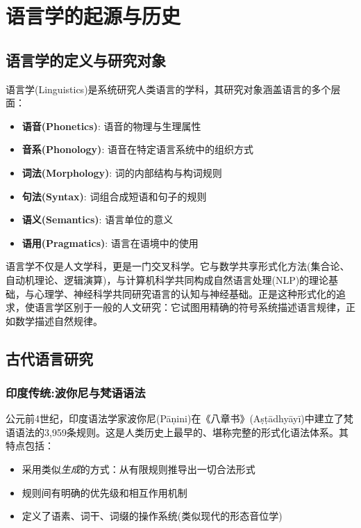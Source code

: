 \clearpage
\vspace*{\fill}
\section{语言学的起源与历史}
\vspace*{\fill}
\clearpage


\subsection{语言学的定义与研究对象}

语言学(Linguistics)是系统研究人类语言的学科，其研究对象涵盖语言的多个层面：
\begin{itemize}
    \item \textbf{语音(Phonetics)}: 语音的物理与生理属性
    \item \textbf{音系(Phonology)}: 语音在特定语言系统中的组织方式
    \item \textbf{词法(Morphology)}: 词的内部结构与构词规则
    \item \textbf{句法(Syntax)}: 词组合成短语和句子的规则
    \item \textbf{语义(Semantics)}: 语言单位的意义
    \item \textbf{语用(Pragmatics)}: 语言在语境中的使用
\end{itemize}

语言学不仅是人文学科，更是一门交叉科学。它与数学共享形式化方法(集合论、自动机理论、逻辑演算)，与计算机科学共同构成自然语言处理(NLP)的理论基础，与心理学、神经科学共同研究语言的认知与神经基础。正是这种形式化的追求，使语言学区别于一般的人文研究：它试图用精确的符号系统描述语言规律，正如数学描述自然规律。

\subsection{古代语言研究}

\subsubsection{印度传统:波你尼与梵语语法}

公元前4世纪，印度语法学家波你尼(Pāṇini)在《八章书》(Aṣṭādhyāyī)中建立了梵语语法的3,959条规则。这是人类历史上最早的、堪称完整的形式化语法体系。其特点包括：
\begin{itemize}
    \item 采用类似\emph{生成}的方式：从有限规则推导出一切合法形式
    \item 规则间有明确的优先级和相互作用机制
    \item 定义了语素、词干、词缀的操作系统(类似现代的形态音位学)
\end{itemize}

